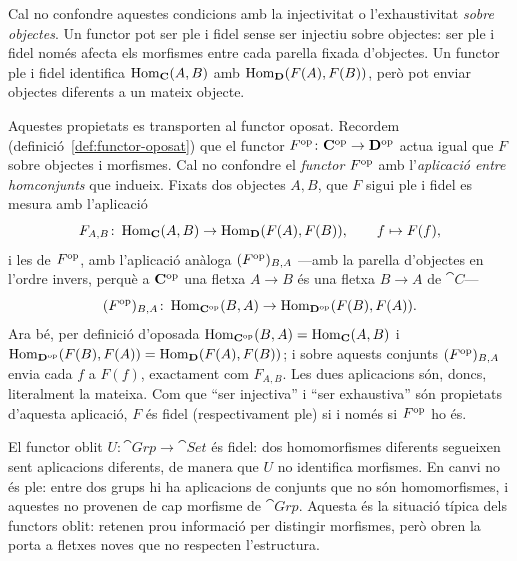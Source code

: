 \begin{observacio}
Cal no confondre aquestes condicions amb la injectivitat o l'exhaustivitat \emph{sobre objectes}. Un functor pot ser ple i fidel sense ser injectiu sobre objectes: ser ple i fidel només afecta els morfismes entre cada parella fixada d'objectes. Un functor ple i fidel identifica $\operatorname{Hom}_{\mathbf{C}}(A,B)$ amb $\operatorname{Hom}_{\mathbf{D}}(F(A),F(B))$, però pot enviar objectes diferents a un mateix objecte.
\end{observacio}

\begin{observacio}
Aquestes propietats es transporten al functor oposat. Recordem (definició~\ref{def:functor-oposat}) que el functor $F^{\mathrm{op}}\colon\mathbf{C}^{\mathrm{op}}\to\mathbf{D}^{\mathrm{op}}$ actua igual que $F$ sobre objectes i morfismes. Cal no confondre el \emph{functor} $F^{\mathrm{op}}$ amb l'\emph{aplicació entre homconjunts} que indueix. Fixats dos objectes $A,B$, que $F$ sigui ple i fidel es mesura amb l'aplicació
\[
F_{A,B}\colon\operatorname{Hom}_{\mathbf{C}}(A,B)\to\operatorname{Hom}_{\mathbf{D}}(F(A),F(B)),\qquad f\mapsto F(f),
\]
i les de $F^{\mathrm{op}}$, amb l'aplicació anàloga $(F^{\mathrm{op}})_{B,A}$ ---amb la parella d'objectes en l'ordre invers, perquè a $\mathbf{C}^{\mathrm{op}}$ una fletxa $A\to B$ és una fletxa $B\to A$ de $\cat{C}$---
\[
(F^{\mathrm{op}})_{B,A}\colon\operatorname{Hom}_{\mathbf{C}^{\mathrm{op}}}(B,A)\to\operatorname{Hom}_{\mathbf{D}^{\mathrm{op}}}(F(B),F(A)).
\]
Ara bé, per definició d'oposada $\operatorname{Hom}_{\mathbf{C}^{\mathrm{op}}}(B,A)=\operatorname{Hom}_{\mathbf{C}}(A,B)$ i $\operatorname{Hom}_{\mathbf{D}^{\mathrm{op}}}(F(B),F(A))=\operatorname{Hom}_{\mathbf{D}}(F(A),F(B))$; i sobre aquests conjunts $(F^{\mathrm{op}})_{B,A}$ envia cada $f$ a $F(f)$, exactament com $F_{A,B}$. Les dues aplicacions són, doncs, literalment la mateixa. Com que \enquote{ser injectiva} i \enquote{ser exhaustiva} són propietats d'aquesta aplicació, $F$ és fidel (respectivament ple) si i només si $F^{\mathrm{op}}$ ho és.
\end{observacio}

\begin{exemple}
El functor oblit $U\colon\cat{Grp}\to\cat{Set}$ és fidel: dos homomorfismes diferents segueixen sent aplicacions diferents, de manera que $U$ no identifica morfismes. En canvi no és ple: entre dos grups hi ha aplicacions de conjunts que no són homomorfismes, i aquestes no provenen de cap morfisme de $\cat{Grp}$. Aquesta és la situació típica dels functors oblit: retenen prou informació per distingir morfismes, però obren la porta a fletxes noves que no respecten l'estructura.
\end{exemple}

